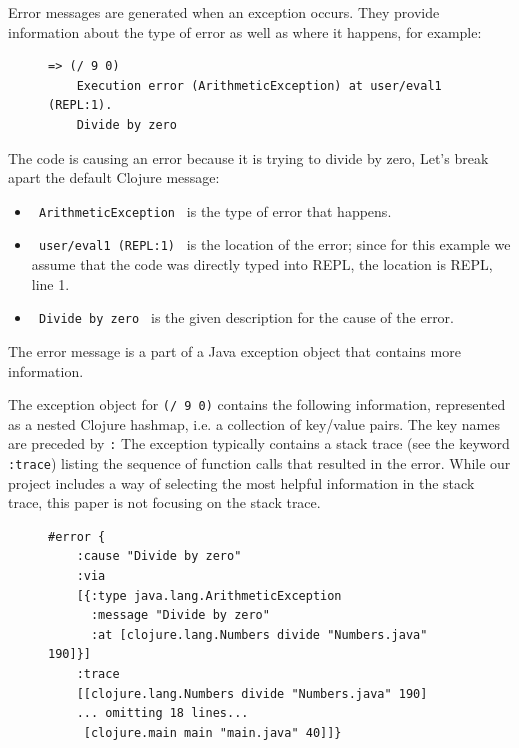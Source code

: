 \documentclass[12pt]{article}
\begin{document}
   Error messages are generated when an exception occurs. They provide information about
   the type of error as well as where it happens, for example:

	\begin{figure}[h]
		\centering
		\begin{lstlisting}[breaklines=true, basicstyle=\ttfamily]
	=> (/ 9 0)
	Execution error (ArithmeticException) at user/eval1 (REPL:1).
	Divide by zero
		\end{lstlisting}
	\end{figure}


The code is causing an error because it is trying to divide by zero, Let's break apart the default Clojure message:
	\begin{itemize}
		\item \texttt{ ArithmeticException } is the type of error that happens.
		\item \texttt{ user/eval1 (REPL:1) } is the location of the error; since for this example we assume that the code was directly typed into REPL, the location is REPL, line 1. 
		\item \texttt{ Divide by zero } is the given description for the cause of the error.
	\end{itemize}
The error message is a part of a Java exception object that contains more information. 

The exception object for \texttt{(/ 9 0)} contains the following information, represented as a nested Clojure hashmap, 
i.e. a collection of key/value pairs. The key names are preceded by \texttt{:} The exception typically contains a stack trace (see the keyword \texttt{:trace}) listing the sequence of function calls that resulted in the error. While our project includes a way of selecting the most helpful information in the stack trace, this paper is not focusing on the stack trace. 

	\begin{figure}[h]
		\centering
		\begin{lstlisting}[breaklines=true, basicstyle=\ttfamily]
#error {
	:cause "Divide by zero"
	:via
	[{:type java.lang.ArithmeticException
	  :message "Divide by zero"
	  :at [clojure.lang.Numbers divide "Numbers.java" 190]}]
	:trace
	[[clojure.lang.Numbers divide "Numbers.java" 190]
	... omitting 18 lines...
	 [clojure.main main "main.java" 40]]}

		\end{lstlisting}
	\end{figure}
	
\end{document}
